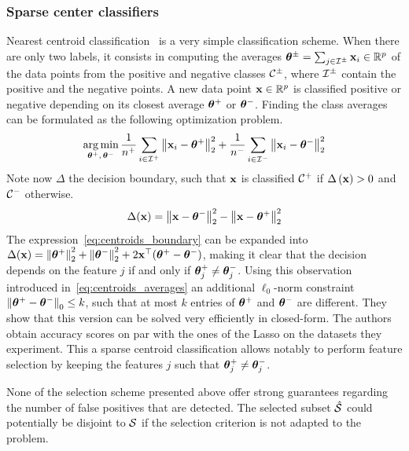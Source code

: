 \subsubsection{Sparse center classifiers}

Nearest centroid classification~\citep{centroid_classification} is a very simple classification scheme.
When there are only two labels,
it consists in computing the averages $\bm{\theta}^\pm = \sum_{j \in \mathcal{I}^\pm} \mathbf{x}_i \in \mathbb{R}^p$
of the data points from the positive and negative classes $\mathcal{C}^\pm$,
where $\mathcal{I}^\pm$ contain the positive and the negative points.
A new data point $\mathbf{x} \in \mathbb{R}^p$ is classified positive or negative depending on its closest average
$\bm{\theta}^+$ or $\bm{\theta}^-$.
Finding the class averages can be formulated as the following optimization problem.
\begin{equation}\label{eq:centroids_averages}
    \operatorname*{arg\,min}_{\bm{\theta}^+,\, \bm{\theta}^-}
        \frac{1}{n^+} \sum_{i \in \mathcal{I}^+} \big\lVert \mathbf{x}_i - \bm{\theta}^+ \big\rVert^2_2
        + \frac{1}{n^-} \sum_{i \in \mathcal{I}^-} \big\lVert \mathbf{x}_i - \bm{\theta}^- \big\rVert^2_2
\end{equation}
Note now $\Delta$ the decision boundary,
such that $\mathbf{x}$ is classified $\mathcal{C}^+$ if $\Delta\left( \mathbf{x} \right) > 0$ and $\mathcal{C}^-$ otherwise.
\begin{equation}\label{eq:centroids_boundary}
    \Delta(\mathbf{x}) = \left\lVert\mathbf{x} - \bm{\theta}^-\right\rVert^2_2 - \left\lVert\mathbf{x} - \bm{\theta}^+\right\rVert^2_2
\end{equation}
The expression~\ref{eq:centroids_boundary} can be expanded into
$\Delta(\mathbf{x}) = \left\lVert\bm{\theta}^+\right\rVert^2_2 + \left\lVert\bm{\theta}^-\right\rVert^2_2 + 2\mathbf{x}^\top(\bm{\theta}^+ - \bm{\theta}^-)$,
making it clear that the decision depends on the feature $j$ if and only if $\bm{\theta}^+_j \neq \bm{\theta}^-_j$.
Using this observation~\cite{sparse_center_classifiers} introduced in~\ref{eq:centroids_averages}
an additional $\ell_0$-norm constraint $\left\lVert\bm{\theta}^+ - \bm{\theta}^-\right\rVert_0 \leq k$,
such that at most $k$ entries of $\bm{\theta}^+$ and $\bm{\theta}^-$ are different.
They show that this version can be solved very efficiently in closed-form.
The authors obtain accuracy scores on par with the ones of the Lasso on the datasets they experiment.
This a sparse centroid classification allows notably to perform feature selection
by keeping the features $j$ such that $\bm{\theta}^+_j \neq \bm{\theta}^-_j$.

\bigbreak
None of the selection scheme presented above offer strong guarantees regarding
the number of false positives that are detected.
The selected subset $\hat{\mathcal{S}}$ could potentially be disjoint to $\mathcal{S}$
if the selection criterion is not adapted to the problem.

